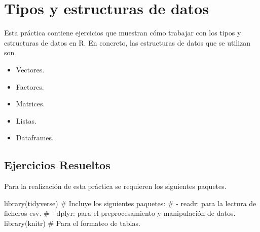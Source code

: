 \documentclass[
  spanish,
  a4paper,
]{scrreport}
\newenvironment{Shaded}{\begin{snugshade}}{\end{snugshade}}
\newcommand{\CommentTok}[1]{\textcolor[rgb]{0.37,0.37,0.37}{#1}}
\newcommand{\FunctionTok}[1]{\textcolor[rgb]{0.28,0.35,0.67}{#1}}
\newcommand{\NormalTok}[1]{\textcolor[rgb]{0.00,0.23,0.31}{#1}}
\providecommand{\tightlist}{%
  \setlength{\itemsep}{0pt}\setlength{\parskip}{0pt}}
\theoremstyle{definition}
\theoremstyle{remark}
\begin{document}

\chapter{Tipos y estructuras de
datos}\label{tipos-y-estructuras-de-datos}

Esta práctica contiene ejercicios que muestran cómo trabajar con los
tipos y estructuras de datos en R. En concreto, las estructuras de datos
que se utilizan son

\begin{itemize}
\tightlist
\item
  Vectores.
\item
  Factores.
\item
  Matrices.
\item
  Listas.
\item
  Dataframes.
\end{itemize}

\section{Ejercicios Resueltos}\label{ejercicios-resueltos}

Para la realización de esta práctica se requieren los siguientes
paquetes.

\begin{Shaded}
\begin{Highlighting}[]
\FunctionTok{library}\NormalTok{(tidyverse) }
\CommentTok{\# Incluye los siguientes paquetes:}
\CommentTok{\# {-} readr: para la lectura de ficheros csv. }
\CommentTok{\# {-} dplyr: para el preprocesamiento y manipulación de datos.}
\FunctionTok{library}\NormalTok{(knitr) }\CommentTok{\# Para el formateo de tablas.}
\end{Highlighting}
\end{Shaded}
\end{document}
